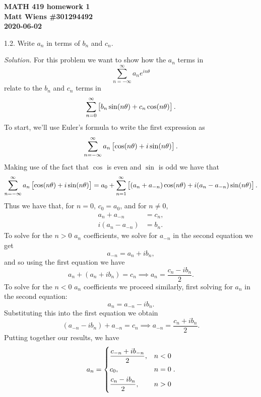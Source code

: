 \documentclass{article}
\begin{document}
\textbf{MATH 419 homework 1} \\
\textbf{Matt Wiens \#301294492} \\
\textbf{2020-06-02}

1.2. Write $a_n$ in terms of $b_n$ and $c_n$.

\textit{Solution.}
For this problem we want to show how the $a_n$ terms in
%
\begin{equation*}
    \sum_{n = - \infty}^\infty a_n e^{i n \theta}
\end{equation*}
%
relate to the $b_n$ and $c_n$ terms in
%
\begin{equation*}
    \sum_{n = 0}^\infty \sbr{b_n \sin(n \theta) + c_n \cos(n \theta)}
    .
\end{equation*}
%
To start, we'll use Euler's formula to write the first expression as
%
\begin{equation*}
    \sum_{n = - \infty}^\infty a_n \sbr{\cos(n \theta) + i \sin(n \theta)}
    .
\end{equation*}
%
Making use of the fact that $\cos$ is even and $\sin$ is odd we have that
%
\begin{equation*}
    \sum_{n = - \infty}^\infty a_n \sbr{\cos(n \theta) + i \sin(n \theta)}
    =
    a_0
    +
    \sum_{n = 1}^\infty \sbr{(a_n + a_{-n}) \cos(n \theta) + i (a_n - a_{-n}) \sin(n \theta)}
    .
\end{equation*}
%
Thus we have that, for $n = 0$, $c_0 = a_0$, and for $n \neq 0$,
%
\begin{align*}
    a_n + a_{-n} &= c_n, \\
    i (a_n - a_{-n}) &= b_n
    .
\end{align*}
%
To solve for the $n > 0$ $a_n$ coefficients, we
solve for $a_{-n}$ in the second equation we get
%
\begin{equation*}
    a_{-n} = a_n + i b_n
    ,
\end{equation*}
%
and so using the first equation we have
%
\begin{equation*}
    a_n + (a_n + i b_n) = c_n \implies a_n = \frac{c_n - i b_n}{2}
    .
\end{equation*}
%
To solve for the $n < 0$ $a_n$ coefficients we proceed similarly, first
solving for $a_n$ in the second equation:
%
\begin{equation*}
    a_{n} = a_{-n} - i b_n
    .
\end{equation*}
%
Substituting this into the first equation we obtain
%
\begin{equation*}
    (a_{-n} - i b_n) + a_{-n} = c_n \implies a_{-n} = \frac{c_n + i b_n}{2}
    .
\end{equation*}
%
Putting together our results, we have
%
\begin{equation*}
    a_n =
    \begin{dcases}
        \frac{c_{-n} + i b_{-n}}{2},&n < 0 \\
        c_0,&n = 0 \\
        \frac{c_n - i b_n}{2},&n > 0
    \end{dcases}
    .
\end{equation*}
\end{document}

